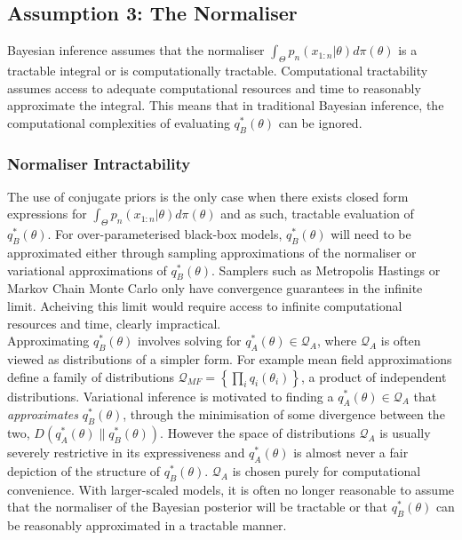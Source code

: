 \documentclass[twoside,11pt]{article}
\begin{document}
\subsection{Assumption 3: The Normaliser}

Bayesian inference assumes that the normaliser $\int_{\Theta} p_n(x_{1:n}|\theta) d \pi(\theta)$ is a tractable integral or is computationally tractable. Computational tractability assumes access to  adequate computational resources and time to reasonably approximate the integral. This means that in traditional Bayesian inference, the computational complexities of evaluating $q_B^*(\theta)$ can be ignored. 
\subsubsection{Normaliser Intractability}
The use of conjugate priors is the only case when there exists closed form expressions for $\int_{\Theta} p_n(x_{1:n}|\theta) d \pi(\theta)$ and as such, tractable evaluation of $q_B^*(\theta)$. For over-parameterised black-box models, $q_B^*(\theta)$ will need to be approximated either through sampling approximations of the normaliser or variational approximations of $q_B^*(\theta)$. Samplers such as Metropolis Hastings or Markov Chain Monte Carlo only have convergence guarantees in the infinite limit. Acheiving this limit would require access to infinite computational resources and time, clearly impractical. \\
\newline
Approximating $q_B^*(\theta)$ involves solving for $q_A^*(\theta) \in \mathcal{Q}_{A}$, where $\mathcal{Q}_{A}$ is often viewed as distributions of a simpler form. For example mean field approximations define a family of distributions $\mathcal{Q}_{MF} = \left\{\prod_i q_i(\theta_i)\right\}$, a product of independent distributions. Variational inference is motivated to finding a $q_A^*(\theta) \in \mathcal{Q}_{A}$ that \textit{approximates} $q_B^*(\theta)$, through the minimisation of some divergence between the two, $D(q_A^*(\theta)\| q_B^*(\theta))$. However the space of distributions $\mathcal{Q}_{A}$ is usually severely restrictive in its expressiveness and $q_A^*(\theta)$ is almost never a fair depiction of the structure of $q_B^*(\theta)$. $\mathcal{Q}_{A}$ is chosen purely for computational convenience. With larger-scaled models, it is often no longer reasonable to assume that the normaliser of the Bayesian posterior will be tractable or that $q_B^*(\theta)$ can be reasonably approximated in a tractable manner.
\end{document}
